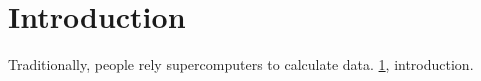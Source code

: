 \chapter{Introduction}
\label{chap:intro}
Traditionally, people rely supercomputers to calculate data.  \ref{chap:intro}, introduction.
